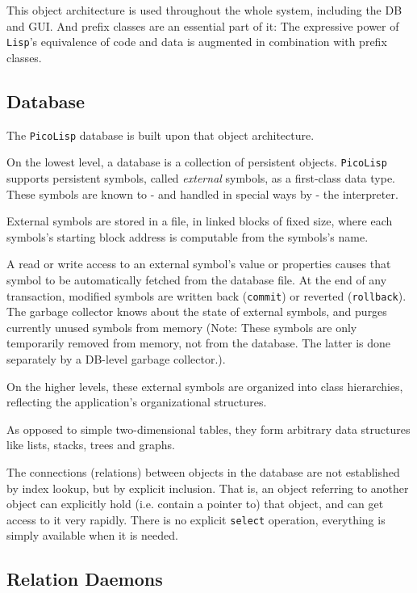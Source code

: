 This object architecture is used throughout the whole system, including
the DB and GUI. And prefix classes are an essential part of it: The
expressive power of \texttt{Lisp}'s equivalence of code and data is augmented
in combination with prefix classes.

 
\subsection{Database}
\label{sec:ul-databast}


The \texttt{PicoLisp} database is built upon that object architecture.

On the lowest level, a database is a collection of persistent objects.
\texttt{PicoLisp} supports persistent symbols, called \emph{external} symbols, as a
first-class data type. These symbols are known to - and handled in
special ways by - the interpreter.

External symbols are stored in a file, in linked blocks of fixed size,
where each symbols's starting block address is computable from the
symbols's name.

A read or write access to an external symbol's value or properties
causes that symbol to be automatically fetched from the database file.
At the end of any transaction, modified symbols are written back
(\texttt{commit}) or reverted (\texttt{rollback}). The garbage collector knows about
the state of external symbols, and purges currently unused symbols from
memory (Note: These symbols are only temporarily removed from memory,
not from the database. The latter is done separately by a DB-level
garbage collector.).

On the higher levels, these external symbols are organized into class
hierarchies, reflecting the application's organizational structures.

As opposed to simple two-dimensional tables, they form arbitrary data
structures like lists, stacks, trees and graphs.

The connections (relations) between objects in the database are not
established by index lookup, but by explicit inclusion. That is, an
object referring to another object can explicitly hold (i.e. contain a
pointer to) that object, and can get access to it very rapidly. There is
no explicit \texttt{select} operation, everything is simply available when it
is needed.

 
\subsection{Relation Daemons}
\label{sec:ul-rel-daemons}


